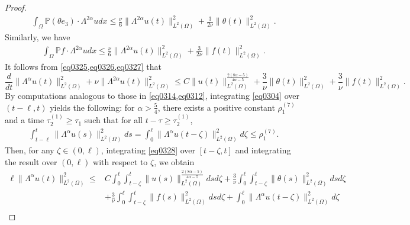 \documentclass[oneside,preprint,12pt,numbers,sort&compress]{elsarticle}
\begin{document}
\begin{proof}
\begin{equation}
\begin{aligned}
  \int_{\Omega} \mathbb{P} (\theta e_3) \cdot \Lambda^{2\alpha} u dx \leq \frac{\nu}{6} \|\Lambda^{2\alpha} u(t)\|_{L^2(\Omega)}^{2}+ \frac{3}{2\nu}
  \|\theta(t)\|_{L^2(\Omega)}^{2}.
\end{aligned}
\end{equation}
Similarly, we have
\begin{equation}\label{eq0327}
\begin{aligned}
  \int_{\Omega} \mathbb{P} f \cdot \Lambda^{2\alpha} u dx\leq \frac{\nu}{6} \|\Lambda^{2\alpha} u(t)\|_{L^2(\Omega)}^{2}+ \frac{3}{2\nu}
  \|f(t)\|_{L^2(\Omega)}^{2}.
\end{aligned}
\end{equation}
It follows from \cref{eq0325,eq0326,eq0327} that
\begin{equation}\label{eq0328}
  \frac{d}{dt}\| \Lambda^{\alpha}u(t) \|_{L^2(\Omega)}^{2}
  +\nu \| \Lambda^{2\alpha} u(t) \|_{L^2(\Omega)}^{2}
  \leq  C
  \|u(t)\|_{L^2(\Omega)}^{\frac{2(8\alpha-5)}{4\alpha-5}}
  +\frac{3}{\nu}
  \|\theta(t)\|_{L^2(\Omega)}^{2}
  +\frac{3}{\nu}
  \|f(t)\|_{L^2(\Omega)}^{2}.
\end{equation}
By computations analogous to those in \cref{eq0314,eq0312}, integrating \cref{eq0304} over $(t-\ell,t)$ yields the following: for $\alpha > \frac{5}{4}$, there exists a positive constant $\rho_{1}^{(7)}$ and a time $\tau_{2}^{(1)} \geq \tau_{1}$ such that for all $t-\tau \geq \tau_{2}^{(1)}$,
\begin{align*}
  \int_{t-\ell}^{t} \|\Lambda^\alpha u(s)\|_{L^2(\Omega)}^2 ds
  =\int_{0}^{\ell} \|\Lambda^\alpha u(t-\zeta)\|_{L^2(\Omega)}^2 d\zeta
  \leq \rho_{1}^{(7)}.
\end{align*}
Then, for any \(\zeta \in (0, \ell)\), integrating \cref{eq0328} over \([t - \zeta, t]\) and integrating the result over \((0, \ell)\) with respect to \(\zeta\), we obtain
\begin{equation}\label{eq0329}
\begin{aligned}
  \ell \| \Lambda^{\alpha} u(t)\|_{L^2(\Omega)}^{2}
  \leq & C\int_{0}^{\ell}\int_{t-\zeta}^{t}
  \|u(s)\|_{L^2(\Omega)}^{\frac{2(8\alpha-5)}{4\alpha-5}}ds d\zeta
  +\frac{3}{\nu}\int_{0}^{\ell}\int_{t-\zeta}^{t}
  \|\theta(s)\|_{L^2(\Omega)}^{2}
   ds d\zeta
  \\
  &+\frac{3}{\nu}\int_{0}^{\ell}\int_{t-\zeta}^{t}
  \|f(s)\|_{L^2(\Omega)}^{2} ds d\zeta
  +\int_{0}^{\ell} \| \Lambda^{\alpha} u(t-\zeta)\|_{L^2(\Omega)}^{2}d\zeta
  \\

\end{aligned}
\end{equation}
\end{proof}
\end{document}

